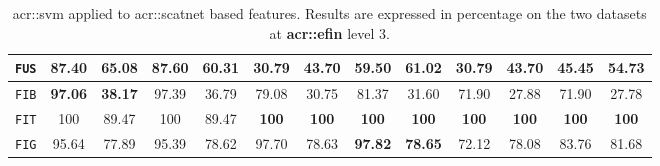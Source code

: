 \begin{sidewaystable}[htpb]
\begin{tabular}{| c | c c | c c | c c | c c | c c | c c |}
                    \hline
                    \texttt{FUS} & \textbf{87.40} & \textbf{65.08} & 87.60 & 60.31 & 30.79 & 43.70 & 59.50 & 61.02 & 30.79 & 43.70 & 45.45 & 54.73 \\
                    \hline
                    \texttt{FIB} & \textbf{97.06} & \textbf{38.17} & 97.39 & 36.79 & 79.08 & 30.75 & 81.37 & 31.60 & 71.90 & 27.88 & 71.90 & 27.78 \\
                    \hline
                    \texttt{FIT} & 100 & 89.47 & 100 & 89.47 & \textbf{100} & \textbf{100} & \textbf{100} & \textbf{100} & \textbf{100} & \textbf{100} & \textbf{100} & \textbf{100} \\
                    \hline
                    \texttt{FIG} & 95.64 & 77.89 & 95.39 & 78.62 & 97.70 & 78.63 & \textbf{97.82} & \textbf{78.65} & 72.12 & 78.08 & 83.76 & 81.68 \\
                    \hline
                \end{tabular}
                \caption{
                    \label{tab::stats_scat_svm_f3}
                    \gls{acr::svm} applied to \gls{acr::scatnet} based features.
                    Results are expressed in percentage on the two datasets at \textbf{\gls{acr::efin}} level 3.
                }
            \end{sidewaystable}
    
